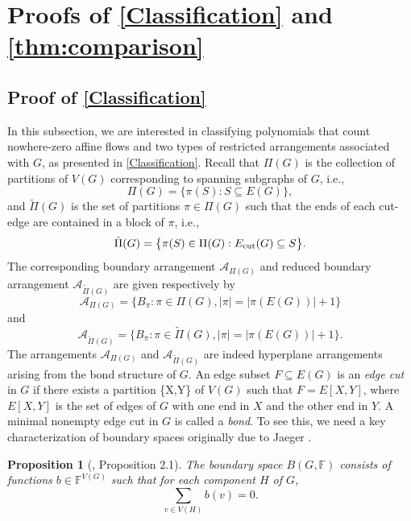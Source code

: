 \documentclass[12pt]{article}%
\renewcommand*{\bm}[1]{#1}%
\numberwithin{equation}{section}
\newtheorem{proposition}[proposition]{Proposition}
\begin{document}
\section{Proofs of \autoref{Classification} and \autoref{thm:comparison}}\label{Sec4}
\subsection{Proof of \autoref{Classification}}\label{Sec4-1}
In this subsection, we are interested in classifying polynomials that count nowhere-zero affine flows and two types of restricted arrangements associated with $G$, as presented in \autoref{Classification}. Recall that $\Pi(G)$ is the collection of partitions of $V(G)$ corresponding to spanning subgraphs of $G$, i.e.,
\[\Pi(G)=\big\{\pi(S):S\subseteq E(G)\big\},\] 
and $\tilde{\Pi}(G)$ is the set of partitions $\pi\in\Pi(G)$ such that the ends of each cut-edge are contained in a block of $\pi$, i.e.,
\[
\tilde{\Pi}(G)=\big\{\pi(S)\in \Pi(G):E_{\rm cut}(G)\subseteq S\big\}.
\]
The corresponding boundary arrangement $\mathcal{A}_{\Pi(G)}$ and reduced boundary arrangement $\mathcal{A}_{\tilde{\Pi}(G)}$ are given respectively by
\[
\mathcal{A}_{\Pi(G)}=\big\{B_\pi:\pi\in\Pi(G), |\pi|=|\pi(E(G))|+1\big\}
\]
and
\[
\mathcal{A}_{\tilde{\Pi}(G)}=\big\{B_\pi:\pi\in\tilde{\Pi}(G), |\pi|=|\pi(E(G))|+1\big\}.
\]
The arrangements $\mathcal{A}_{\Pi(G)}$ and $\mathcal{A}_{\tilde{\Pi}(G)}$ are indeed hyperplane arrangements arising from the bond structure of $G$. An edge subset $F\subseteq E(G)$  is an {\em edge cut} in $G$ if there exists a partition \{X,Y\} of $V(G)$ such that $F=E[X,Y]$, where $E[X,Y]$ is the  set of edges of $G$ with one end in $X$ and the other end in $Y$. A minimal nonempty edge cut in $G$ is called a {\em bond}. To see this, we need a key characterization of boundary spaces originally due to Jaeger \cite{Jaeger1992}.  
\begin{proposition}[\cite{Jaeger1992}, Proposition 2.1]\label{prop:characterization of boundary space} 
The boundary space $B(G,\mathbb{F})$ consists of functions $\bm b\in \mathbb{F}^{V(G)}$ such that for each component $H$ of $G$,
\[
\sum_{v\in V(H)}\bm b(v)=0.
\]
\end{proposition}
\end{document}
